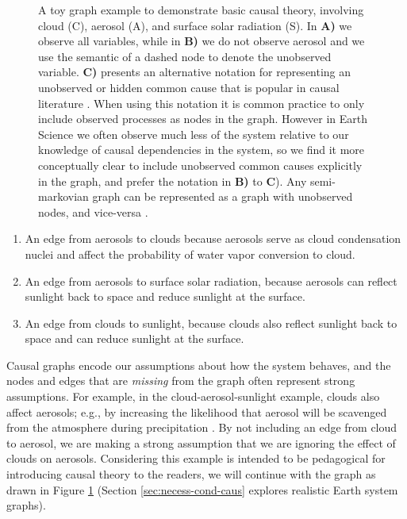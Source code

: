 \documentclass[12pt]{article}
\begin{document}
\begin{figure}
  \scalebox{1.0}{}
  \caption{A toy graph example to demonstrate basic causal theory,
    involving cloud (C), aerosol (A), and surface solar radiation
    (S). In \textbf{A)} we observe all variables, while in \textbf{B)}
    we do not observe aerosol and we use the semantic of a dashed node
    to denote the unobserved variable. \textbf{C)} presents an
    alternative notation for representing an unobserved or hidden
    common cause that is popular in causal literature \citep[e.g.,
    ``semi-markovian graphs'',][]{shpitser2006}. When using this
    notation it is common practice to only include observed processes
    as nodes in the graph. However in Earth Science we often observe
    much less of the system relative to our knowledge of causal
    dependencies in the system, so we find it more conceptually clear
    to include unobserved common causes explicitly in the graph, and
    prefer the notation in \textbf{B)} to \textbf{C}). Any
    semi-markovian graph can be represented as a graph with unobserved
    nodes, and vice-versa \citep[e.g.,][]{lee2019structural}.}
  \label{fig:toy}
\end{figure}

\begin{enumerate}
\item An edge from aerosols to clouds because aerosols serve as cloud
  condensation nuclei and affect the probability of water vapor
  conversion to cloud.
\item An edge from aerosols to surface solar radiation, because
  aerosols can reflect sunlight back to space and reduce sunlight
  at the surface.
\item An edge from clouds to sunlight, because clouds also reflect
  sunlight back to space and can reduce sunlight at the surface.
\end{enumerate}

Causal graphs encode our assumptions about how the system behaves, and
the nodes and edges that are \textit{missing} from the graph often
represent strong assumptions. For example, in the
cloud-aerosol-sunlight example, clouds also affect aerosols; e.g., by
increasing the likelihood that aerosol will be scavenged from the
atmosphere during precipitation \citep[e.g.,][]{radke-scavenge-1980,
  JURADO20087931, blanco-alegre2018}. By not including an edge from
cloud to aerosol, we are making a strong assumption that we are
ignoring the effect of clouds on aerosols. Considering this example is
intended to be pedagogical for introducing causal theory to the
readers, we will continue with the graph as drawn in Figure
\ref{fig:toy} (Section \ref{sec:necess-cond-caus} explores realistic
Earth system graphs).
\end{document}
